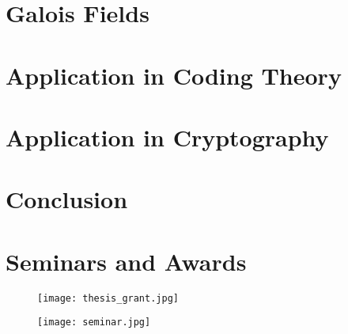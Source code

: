 \documentclass[a4paper,12pt,oneside,onecolumn,openany,final]{memoir}
\begin{document}
\chapter{Galois Fields}


\chapter{Application in Coding Theory}


\chapter{Application in Cryptography}


\chapter{Conclusion}



\backmatter

\chapter*{Seminars and Awards}
\begin{figure}[h]
  \texttt{[image: thesis\_grant.jpg]}
\end{figure}

\vspace{3mm}
\begin{figure}[h]
  \texttt{[image: seminar.jpg]}
\end{figure}
\clearpage



\end{document}
